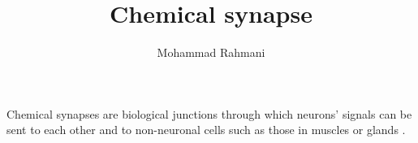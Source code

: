 \documentclass[a4paper]{article}
\title{Chemical synapse}
\date{}
\author{Mohammad Rahmani}
\begin{document}
\maketitle
    Chemical synapses are biological junctions through which neurons' signals can be sent to each other and to non-neuronal cells such as those in muscles or glands .
    
    
\end{document}
